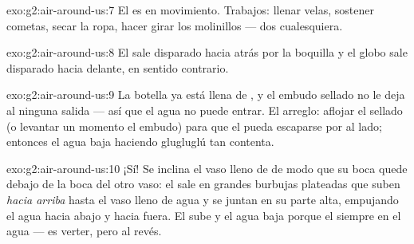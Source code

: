 \begin{solution}{exo:g2:air-around-us:7}
El  es  en movimiento. Trabajos: llenar velas, sostener
cometas, secar la ropa, hacer girar los molinillos --- dos
cualesquiera.
\end{solution}

\begin{solution}{exo:g2:air-around-us:8}
El  sale disparado hacia atrás por la boquilla y el globo sale
disparado hacia delante, en sentido contrario.
\end{solution}

\begin{solution}{exo:g2:air-around-us:9}
La botella ya está llena de , y el embudo sellado no le deja al
 ninguna salida --- así que el agua no puede entrar. El arreglo:
aflojar el sellado (o levantar un momento el embudo) para que el
 pueda escaparse por al lado; entonces el agua baja haciendo
glugluglú tan contenta.
\end{solution}

\begin{solution}{exo:g2:air-around-us:10}
¡Sí! Se inclina el vaso lleno de  de modo que su boca quede
debajo de la boca del otro vaso: el  sale en grandes burbujas
plateadas que suben \emph{hacia arriba} hasta el vaso lleno de agua y
se juntan en su parte alta, empujando el agua hacia abajo y hacia
fuera. El  sube y el agua baja porque el  siempre 
en el agua --- es verter, pero al revés.
\end{solution}
